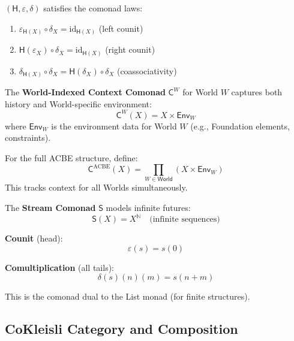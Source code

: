 \begin{proposition}
\label{prop:history-comonad-laws}
$(\mathsf{H}, \varepsilon, \delta)$ satisfies the comonad laws:
\begin{enumerate}[label=(\roman*)]
  \item $\varepsilon_{\mathsf{H}(X)} \circ \delta_X = \mathrm{id}_{\mathsf{H}(X)}$ (left counit)
  \item $\mathsf{H}(\varepsilon_X) \circ \delta_X = \mathrm{id}_{\mathsf{H}(X)}$ (right counit)
  \item $\delta_{\mathsf{H}(X)} \circ \delta_X = \mathsf{H}(\delta_X) \circ \delta_X$ (coassociativity)
\end{enumerate}
\end{proposition}

\begin{definition}
\label{def:world-context-comonad}
The \textbf{World-Indexed Context Comonad} $\mathsf{C}^{W}$ for World $W$ captures
both history and World-specific environment:
\[
  \mathsf{C}^{W}(X) = X \times \mathsf{Env}_W
\]
where $\mathsf{Env}_W$ is the environment data for World $W$ (e.g., Foundation
elements, constraints).

For the full ACBE structure, define:
\[
  \mathsf{C}^{\mathrm{ACBE}}(X) = \prod_{W \in \mathsf{World}} (X \times \mathsf{Env}_W)
\]
This tracks context for all Worlds simultaneously.
\end{definition}

\begin{definition}
\label{def:stream-comonad}
The \textbf{Stream Comonad} $\mathsf{S}$ models infinite futures:
\[
  \mathsf{S}(X) = X^{\mathbb{N}} \quad \text{(infinite sequences)}
\]

\textbf{Counit} (head):
\[
  \varepsilon(s) = s(0)
\]

\textbf{Comultiplication} (all tails):
\[
  \delta(s)(n)(m) = s(n + m)
\]

This is the comonad dual to the List monad (for finite structures).
\end{definition}

\subsection{CoKleisli Category and Composition}
\label{subsec:cokleisli}

